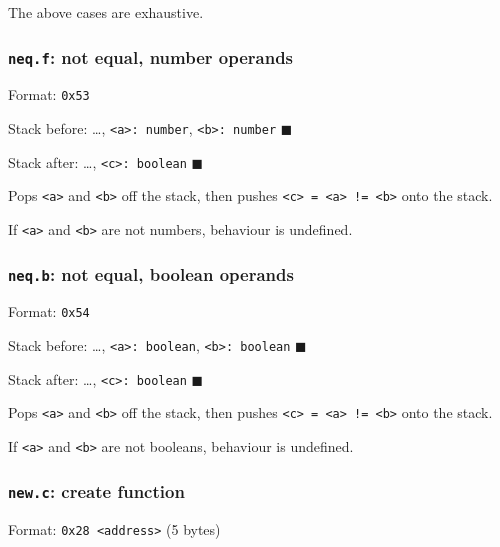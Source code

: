 The above cases are exhaustive.

\subsubsection{\texorpdfstring{\texttt{neq.f}: not equal, number
operands}{neq.f: not equal, number operands}}

Format: \texttt{0x53}

Stack before: \ldots, \texttt{\textless{}a\textgreater{}:\ number},
\texttt{\textless{}b\textgreater{}:\ number} \(\blacksquare\)

Stack after: \ldots, \texttt{\textless{}c\textgreater{}:\ boolean}
\(\blacksquare\)

Pops \texttt{\textless{}a\textgreater{}} and
\texttt{\textless{}b\textgreater{}} off the stack, then pushes
\texttt{\textless{}c\textgreater{}\ =\ \textless{}a\textgreater{}\ !=\ \textless{}b\textgreater{}}
onto the stack.

If \texttt{\textless{}a\textgreater{}} and
\texttt{\textless{}b\textgreater{}} are not numbers, behaviour is
undefined.

\subsubsection{\texorpdfstring{\texttt{neq.b}: not equal, boolean
operands}{neq.b: not equal, boolean operands}}

Format: \texttt{0x54}

Stack before: \ldots, \texttt{\textless{}a\textgreater{}:\ boolean},
\texttt{\textless{}b\textgreater{}:\ boolean} \(\blacksquare\)

Stack after: \ldots, \texttt{\textless{}c\textgreater{}:\ boolean}
\(\blacksquare\)

Pops \texttt{\textless{}a\textgreater{}} and
\texttt{\textless{}b\textgreater{}} off the stack, then pushes
\texttt{\textless{}c\textgreater{}\ =\ \textless{}a\textgreater{}\ !=\ \textless{}b\textgreater{}}
onto the stack.

If \texttt{\textless{}a\textgreater{}} and
\texttt{\textless{}b\textgreater{}} are not booleans, behaviour is
undefined.

\subsubsection{\texorpdfstring{\texttt{new.c}: create
function}{new.c: create function}}

Format: \texttt{0x28\ \textless{}address\textgreater{}} (5 bytes)

